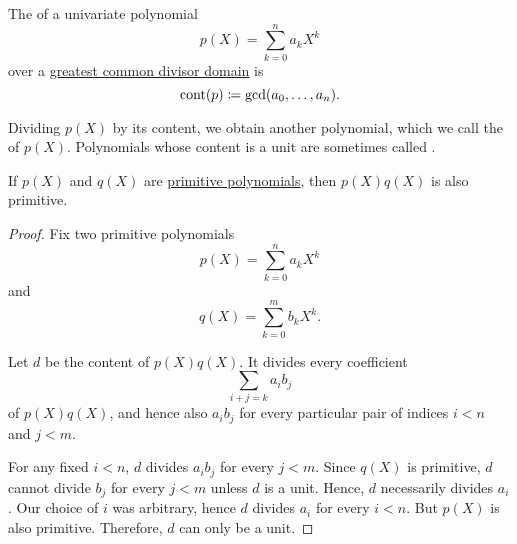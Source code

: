\begin{definition}\label{def:polynomial_content}
  The  of a univariate polynomial
  \begin{equation*}
    p(X) = \sum_{k=0}^n a_k X^k
  \end{equation*}
  over a \hyperref[def:greatest_common_divisor_domain]{greatest common divisor domain} is
  \begin{equation*}
    \operatorname{cont}(p) \coloneqq \gcd(a_0, \ldots, a_n).
  \end{equation*}

  Dividing \( p(X) \) by its content, we obtain another polynomial, which we call the  of \( p(X) \). Polynomials whose content is a unit are sometimes called .
\end{definition}

\begin{lemma}\label{thm:gauss_lemma}
  If \( p(X) \) and \( q(X) \) are \hyperref[def:polynomial_content]{primitive polynomials}, then \( p(X) q(X) \) is also primitive.
\end{lemma}
\begin{proof}
  Fix two primitive polynomials
  \begin{equation*}
    p(X) = \sum_{k=0}^n a_k X^k
  \end{equation*}
  and
  \begin{equation*}
    q(X) = \sum_{k=0}^m b_k X^k.
  \end{equation*}

  Let \( d \) be the content of \( p(X) q(X) \). It divides every coefficient
  \begin{equation*}
    \sum_{i+j=k} a_i b_j
  \end{equation*}
  of \( p(X) q(X) \), and hence also \( a_i b_j \) for every particular pair of indices \( i < n \) and \( j < m \).

  For any fixed \( i < n \), \( d \) divides \( a_i b_j \) for every \( j < m \). Since \( q(X) \) is primitive, \( d \) cannot divide \( b_j \) for every \( j < m \) unless \( d \) is a unit. Hence, \( d \) necessarily divides \( a_i \). Our choice of \( i \) was arbitrary, hence \( d \) divides \( a_i \) for every \( i < n \). But \( p(X) \) is also primitive. Therefore, \( d \) can only be a unit.
\end{proof}

